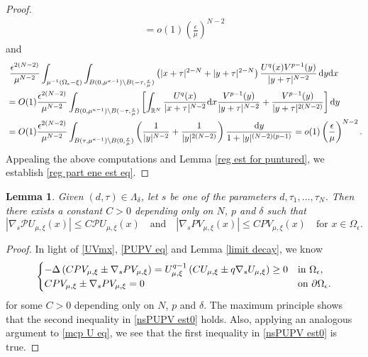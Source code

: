 \documentclass[reqno]{amsart}
\newtheorem{lemma}[theorem]{Lemma}
\theoremstyle{remark}
\newcommand{\pa}{\partial}
\newcommand{\ep}{\epsilon}
\newcommand{\R}{\mathbb{R}}
\newcommand{\mone}{\mathbf{1}}
\newcommand{\mcp}{\mathcal{P}}
\newcommand{\dx}{\textup{d}x}
\newcommand{\dy}{\textup{d}y}
\newcommand{\mx}{{\mu,\xi}}
\renewcommand{\(}{\left(}
\renewcommand{\)}{\right)}
\numberwithin{equation}{section}
\begin{document}
\begin{proof}
\begin{align*}
= o(1)\(\frac{\ep}{\mu}\)^{N-2}
\end{align*}
and
\begin{align*}
&\ \frac{\ep^{2(N-2)}}{\mu^{N-2}} \int_{\mu^{-1}(\Omega_\ep-\xi)} \int_{B(0,\mu^{\kappa-1})\setminus B(-\tau,\frac{\ep}{\mu})} \(| x+\tau|^{2-N}+| y+\tau|^{2-N}\)\frac{U^q(x) V^{p-1}(y)}{|y+\tau|^{N-2}}\, \dy\dx \\
&=O(1)\frac{\ep^{2(N-2)}}{\mu^{N-2}} \int_{B(0,\mu^{\kappa-1})\setminus B(-\tau,\frac{\ep}{\mu})} \left[\int_{\R^N} \frac{U^q(x)}{|x+\tau|^{N-2}} \dx\frac{V^{p-1}(y)}{|y+\tau|^{N-2}} + \frac{V^{p-1}(y)}{|y+\tau|^{2(N-2)}}\right]\dy \\
&=O(1)\frac{\ep^{2(N-2)}}{\mu^{N-2}} \int_{B(\tau,\mu^{\kappa-1})\setminus B(0,\frac{\ep}{\mu})} \(\frac{1}{|y|^{N-2}}+ \frac{1}{|y|^{2(N-2)}}\) \frac{\dy}{1+|y|^{(N-2)(p-1)}}
= o(1) \(\frac{\ep}{\mu}\)^{N-2}.
\end{align*}
Appealing the above computations and Lemma \ref{reg est for puntured}, we establish \eqref{reg part ene est eq}.
\end{proof}

\begin{lemma}\label{nsPUPV est}
Given $(d,\tau) \in \Lambda_\delta$, let $s$ be one of the parameters $d,\tau_1,\ldots,\tau_N$. Then there exists a constant $C > 0$ depending only on $N$, $p$ and $\delta$ such that
\begin{equation}\label{nsPUPV est0}
|\nabla_s\mcp U_\mx(x)| \le C\mcp U_\mx(x) \quad \text{and} \quad |\nabla_s PV_\mx(x)| \le CPV_\mx(x) \quad \text{for } x \in \Omega_\ep.
\end{equation}
\end{lemma}
\begin{proof}
In light of \eqref{UVmx}, \eqref{PUPV eq} and Lemma \ref{limit decay}, we know
\[\begin{cases}
-\Delta \(C PV_\mx \pm \nabla_s PV_\mx\) = U_\mx^{q-1} \(CU_\mx \pm q\nabla_sU_\mx\) \ge 0 &\textup{in } \Omega_\ep,\\
C PV_\mx \pm \nabla_s PV_\mx=0 &\textup{on } \pa \Omega_\ep.
\end{cases}\]
for some $C > 0$ depending only on $N$, $p$ and $\delta$. The maximum principle shows that the second inequality in \eqref{nsPUPV est0} holds.
Also, applying an analogous argument to \eqref{mcp U eq}, we see that the first inequality in \eqref{nsPUPV est0} is true.
\end{proof}
\end{document}
